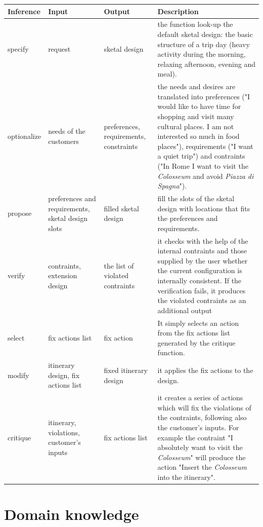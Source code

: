 \documentclass[11pt]{article} %
\begin{document}
\noindent
\begin{tabular}{|p{2cm}|p{3cm}|p{3cm}|p{6cm}|}
  \hline
Inference		& Input	& Output 	& Description \\ \hline \hline
specify		& request	& sketal design		& the function look-up the default sketal design: the basic structure of a trip day (heavy activity during the morning, relaxing afternoon, evening and meal).
\\ \hline 
   optionalize	& needs of the customers		& preferences, requirements, constraints	& the needs and desires are translated into preferences ("I would like to have time for shopping and visit many cultural places. I am not interested so much in food places"), requirements ("I want a quiet trip") and contraints ("In Rome I want to visit the \emph{Colosseum} and avoid \emph{Piazza di Spagna}"). 
\\ \hline
propose	& preferences and requirements, sketal design slots		& filled sketal design	& fill the slots of the sketal design with locations that fits the preferences and requirements.
\\
\hline
verify		& contraints, extension design	& the list of violated contraints	& it checks with the help of the internal contraints and those supplied by the user whether the current configuration is internally consistent. If the verification fails, it produces the violated contraints as an additional output
\\ \hline
select 	& fix actions list		& fix action		& It simply selects an action from the fix actions list generated by the critique function.
\\ \hline
modify	& itinerary design, fix actions list		& fixed itinerary design		& it applies the fix actions to the design.
\\ \hline
critique	& itinerary, violations, customer's inputs	& fix actions list		& it creates a series of actions which will fix the violations of the contraints, following also the customer's inputs. For example the contraint "I absolutely want to visit the \emph{Colosseum}" will produce the action "Insert the \emph{Colosseum} into the itinerary".
\\ \hline
\end{tabular}

\clearpage
\section{Domain knowledge}

\end{document}
